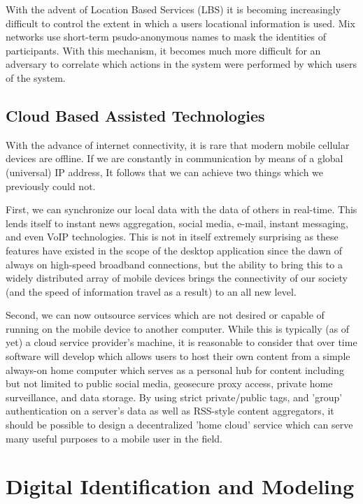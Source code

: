 \documentclass[a4paper,12pt]{report}
\begin{document}
With the advent of Location Based Services (LBS) it is becoming increasingly difficult to control the extent in which a users locational information is used. Mix networks use short-term psudo-anonymous names to mask the identities of participants. With this mechanism, it becomes much more difficult for an adversary to correlate which actions in the system were performed by which users of the system.
\cite{6270872,freudiger2007mix,1032602}
\subsection{Cloud Based Assisted Technologies}

With the advance of internet connectivity, it is rare that modern mobile cellular devices are offline. If we are constantly in communication by means of a global (universal) IP address, It follows that we can achieve two things which we previously could not. 

First, we can synchronize our local data with the data of others in real-time. This lends itself to instant news aggregation, social media, e-mail, instant messaging, and even VoIP technologies. This is not in itself extremely surprising as these features have existed in the scope of the desktop application since the dawn of always on high-speed broadband connections, but the ability to bring this to a widely distributed array of mobile devices brings the connectivity of our society (and the speed of information travel as a result) to an all new level.

Second, we can now outsource services which are not desired or capable of running on the mobile device to another computer. While this is typically (as of yet) a cloud service provider's machine, it is reasonable to consider that over time software will develop which allows users to host their own content from a simple always-on home computer which serves as a personal hub for content including but not limited to public social media, geosecure proxy access, private home surveillance, and data storage. By using strict private/public tags, and 'group' authentication on a server's data as well as RSS-style content aggregators, it should be possible to design a decentralized 'home cloud' service which can serve many useful purposes to a mobile user in the field.

\section{Digital Identification and Modeling}
\end{document}
